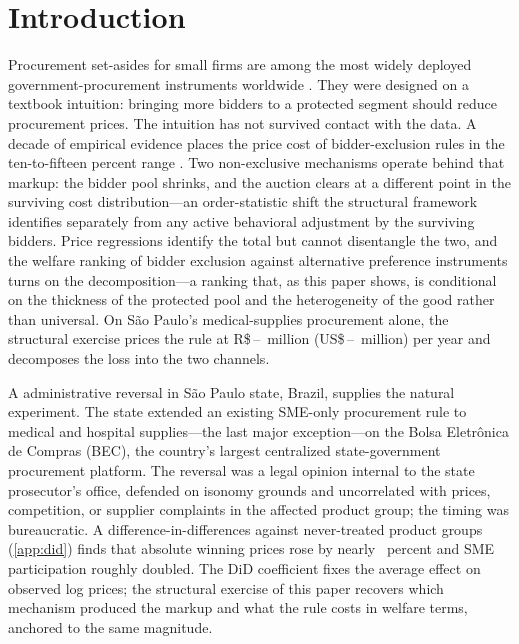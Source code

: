 \section{Introduction}

Procurement set-asides for small firms are among the most widely deployed government-procurement instruments worldwide \citep{bosio2022}. They were designed on a textbook intuition: bringing more bidders to a protected segment should reduce procurement prices. The intuition has not survived contact with the data. A decade of empirical evidence places the price cost of bidder-exclusion rules in the ten-to-fifteen percent range \citep{marion2007, krasnokutskaya2011, athey2013, nakabayashi2013, hyytinen2018}. Two non-exclusive mechanisms operate behind that markup: the bidder pool shrinks, and the auction clears at a different point in the surviving cost distribution---an order-statistic shift the structural framework identifies separately from any active behavioral adjustment by the surviving bidders. Price regressions identify the total but cannot disentangle the two, and the welfare ranking of bidder exclusion against alternative preference instruments turns on the decomposition---a ranking that, as this paper shows, is conditional on the thickness of the protected pool and the heterogeneity of the good rather than universal. On São Paulo's medical-supplies procurement alone, the structural exercise prices the rule at R\$\,\welfAnnualBRLLo--\welfAnnualBRLHi~million (US\$\,\welfAnnualUSDLo--\welfAnnualUSDHi~million) per year and decomposes the loss into the two channels.

A \policyCutoffMonth{} administrative reversal in S\~ao Paulo state, Brazil, supplies the natural experiment. The state extended an existing SME-only procurement rule to medical and hospital supplies---the last major exception---on the Bolsa Eletr\^onica de Compras (BEC), the country's largest centralized state-government procurement platform. The reversal was a legal opinion internal to the state prosecutor's office, defended on isonomy grounds and uncorrelated with prices, competition, or supplier complaints in the affected product group; the timing was bureaucratic. A difference-in-differences against \controlGroupCount{} never-treated product groups (\ref{app:did}) finds that absolute winning prices rose by nearly \didLowerPct~percent and SME participation roughly doubled. The DiD coefficient fixes the average effect on observed log prices; the structural exercise of this paper recovers which mechanism produced the markup and what the rule costs in welfare terms, anchored to the same magnitude.

